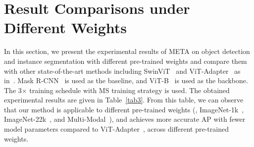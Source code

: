 \section{Result Comparisons under Different Weights}
\label{secS4}
{} In this section, we present the experimental results of META on object detection and instance segmentation with different pre-trained weights and compare them with other state-of-the-art methods including SwinViT~\citep{liu2021swin} and ViT-Adapter~\citep{chen2022vision} as in~\citep{chen2022vision}. 
Mask R-CNN~\citep{he2017mask} is used as the baseline, and ViT-B~\citep{li2022exploring} is used as the backbone. The 3$\times$ training schedule with MS training strategy is used. The obtained experimental results are given in Table~\ref{tab3}.
%
From this table, we can observe that our method is applicable to different pre-trained weights (\ie, ImageNet-1k~\citep{deng2009imagenet}, ImageNet-22k~\citep{steiner2021train}, and Multi-Modal~\citep{zhu2022uni}), and achieves more accurate AP with fewer model parameters compared to ViT-Adapter~\citep{chen2022vision}, across different pre-trained weights.  

